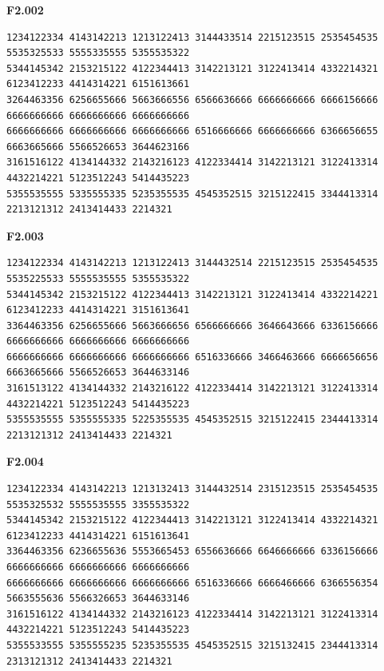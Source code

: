 \noindent\begin{minipage}{\linewidth}\textbf{F2.002}
\begin{lstlisting}
1234122334 4143142213 1213122413 3144433514 2215123515 2535454535 5535325533 5555335555 5355535322
5344145342 2153215122 4122344413 3142213121 3122413414 4332214321 6123412233 4414314221 6151613661
3264463356 6256655666 5663666556 6566636666 6666666666 6666156666 6666666666 6666666666 6666666666
6666666666 6666666666 6666666666 6516666666 6666666666 6366656655 6663665666 5566526653 3644623166
3161516122 4134144332 2143216123 4122334414 3142213121 3122413314 4432214221 5123512243 5414435223
5355535555 5335555335 5235355535 4545352515 3215122415 3344413314 2213121312 2413414433 2214321
\end{lstlisting}
\end{minipage}\par\smallskip

\noindent\begin{minipage}{\linewidth}\textbf{F2.003}
\begin{lstlisting}
1234122334 4143142213 1213122413 3144432514 2215123515 2535454535 5535225533 5555535555 5355535322
5344145342 2153215122 4122344413 3142213121 3122413414 4332214221 6123412233 4414314221 3151613641
3364463356 6256655666 5663666656 6566666666 3646643666 6336156666 6666666666 6666666666 6666666666
6666666666 6666666666 6666666666 6516336666 3466463666 6666656656 6663665666 5566526653 3644633146
3161513122 4134144332 2143216122 4122334414 3142213121 3122413314 4432214221 5123512243 5414435223
5355535555 5355555335 5225355535 4545352515 3215122415 2344413314 2213121312 2413414433 2214321
\end{lstlisting}
\end{minipage}\par\smallskip

\noindent\begin{minipage}{\linewidth}\textbf{F2.004}
\begin{lstlisting}
1234122334 4143142213 1213132413 3144432514 2315123515 2535454535 5535325532 5555535555 3355535322
5344145342 2153215122 4122344413 3142213121 3122413414 4332214321 6123412233 4414314221 6151613641
3364463356 6236655636 5553665453 6556636666 6646666666 6336156666 6666666666 6666666666 6666666666
6666666666 6666666666 6666666666 6516336666 6666466666 6366556354 5663555636 5566326653 3644633146
3161516122 4134144332 2143216123 4122334414 3142213121 3122413314 4432214221 5123512243 5414435223
5355533555 5355555235 5235355535 4545352515 3215132415 2344413314 2313121312 2413414433 2214321
\end{lstlisting}
\end{minipage}\par\smallskip

